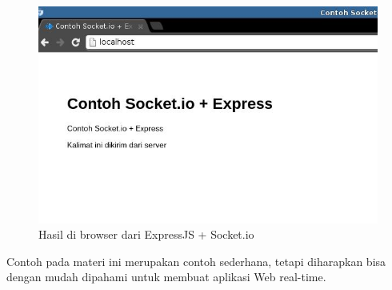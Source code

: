   \begin{figure}
    \begin{center}
      \includegraphics[scale=0.5]{images/socket-io-expressjs.jpg}
    \end{center}
    \caption{Hasil di browser dari ExpressJS + Socket.io}
    \label{fig:socket-io-express}
  \end{figure}

Contoh pada materi ini merupakan contoh sederhana, tetapi diharapkan bisa dengan mudah dipahami untuk membuat aplikasi Web real-time. 
